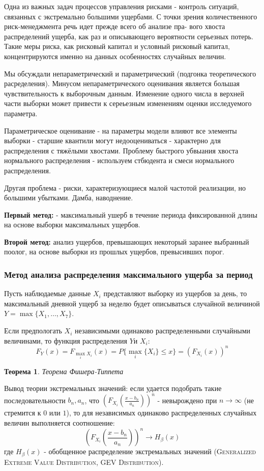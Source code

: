 \documentclass[%
12pt, %
final, %
oneside, %
onecolumn, %
centertags]{article} %
\theoremstyle{plain}
\newtheorem{theorem}{Теорема}[section] %
\theoremstyle{definition}
\theoremstyle{remark}
\begin{document}
Одна из важных задач процессов управления рисками - контроль ситуаций, связанных с экстремально большими ущербами. С точки
зрения количественного риск-менеджмента речь идет прежде всего об анализе пра-
вого хвоста распределений ущерба, как раз и описывающего вероятности серьезных
потерь. Такие меры риска, как рисковый капитал и условный рисковый капитал,
концентрируются именно на данных особенностях случайных величин.

Мы обсуждали непараметрический и параметрический (подгонка теоретического расределения).  Минусом непараметрического оценивания является большая чувствительность к выборочным данным. Изменение одного числа в верхней части выборки может привести к сереьезным изменениям оценки исследуемого параметра.

Параметрическое оценивание - на параметры модели влияют все элементы выборки - старшие квантили могут недооцениваться - характерно для распределения с тяжёлыми хвостами. Проблему быстрого убвыания хвоста нормального распределения - используем стбюдента и смеси нормального распределения.

Другая проблема - риски, характеризующиеся малой частотой реализации, но большими убытками. Дамба, наводнение.

\textbf{Первый метод:} - максимальный ушерб в течение периода фиксированной длины на основе выборки максимальных ущербов.

\textbf{Второй метод:} анализ ущербов, превышающих некоторый заранее выбранный поолог, на основе выборки из прошлых ущербов, превысивших порог.

\subsubsection{Метод анализа распределения максимального ущерба за период}

Пусть наблюдаемые данные $X_i$ представляют выборку из ущербов за день, то максимальный дневной ущерб за неделю будет описываться случайной величиной $Y=\max\{X_1, \ldots, X_7\}$.

Если предпологать $X_i$ независимыми одинаково распределенными случайными величинами, то функция распределения $Y$и $X_i$:
$$F_{Y}(x) = F_{\underset{i}{\max} X_i}(x) = P\{\underset{i}{\max} \{X_i\} \leqslant x\} = (F_{X_i}(x))^n$$

\begin{theorem}
	Теорема Фишера-Типпета
\end{theorem}

Вывод теории экстремальных значений: если удается подобрать такие последовательности $b_n, a_n$, что \(\left(F_{X_i}\left(\frac{x-b_n}{a_n}\right)\right)^n\) - невырождено при $n \to \infty$ (не стремится к $0$ или $1$), то для независимых одинаково распределенных случайных величин выполняется соотношение:
$$\left(F_{X_i}\left(\frac{x-b_n}{a_n}\right)\right)^n \to H_{\beta}(x)$$
где $H_{\beta}(x)$ - обобщенное распределение экстремальных значений (\textsc{Generalized Extreme Value Distribution, GEV Distribution}). 
\end{document}
